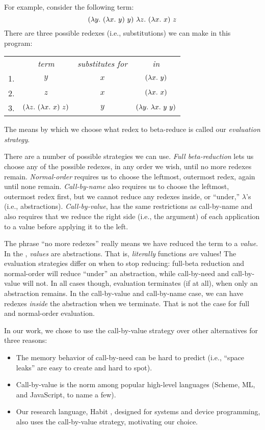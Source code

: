 \documentclass[12pt]{report}
\begin{document}
For example, consider the following term:
\begin{equation}
  \lamAppP{\lamAbs{y}{\lamAppP{\lamAbs{x}{y}}{y}}} %
         {\lamAbs{z}{\lamAppP{\lamAbs{x}{x}}{z}}}
\end{equation}
There are three possible redexes (i.e., substitutions) we can make in 
this program:

\begin{center}
  \begin{tabular}{lccc}
    & \emph{term} & \emph{substitutes for} & \emph{in} \\
    \cmidrule(r){2-2} \cmidrule(r){3-3} \cmidrule(r){4-4}
    1. & $y$ & $x$ & $(\lambda x.\ y)$ \\
    2. & $z$ & $x$ & $(\lambda x.\ x)$ \\
    3. & $(\lambda z.\ (\lambda x.\ x)\ z)$ & $y$ & $(\lambda y.\ \lambda x.\ y\ y)$
  \end{tabular}
\end{center}
The means by which we choose what redex to beta-reduce is called our
\emph{evaluation strategy}.

There are a number of possible strategies we can use. \emph{Full
  beta-reduction} lets us choose any of the possible redexes, in any
order we wish, until no more redexes remain. \emph{Normal-order}
requires us to choose the leftmost, outermost redex, again until none
remain. \emph{Call-by-name} also requires us to choose the leftmost,
outermost redex first, but we cannot reduce any redexes inside, or
``under,'' $\lambda$'s (i.e., abstractions). \emph{Call-by-value}, has
the same restrictions as call-by-name and also requires that we reduce
the right side (i.e., the argument) of each application to a value
before applying it to the left.

The phrase ``no more redexes'' really means we have reduced the term
to a \emph{value}. In the \lamA, \emph{values} are abstractions. That
is, \emph{literally} functions \emph{are} values! The evaluation
strategies differ on when to stop reducing: full-beta reduction and
normal-order will reduce ``under'' an abstraction, while call-by-need
and call-by-value will not. In all cases though, evaluation terminates
(if at all), when only an abstraction remains. In the call-by-value
and call-by-name case, we can have redexes \emph{inside} the
abstraction when we terminate. That is not the case for full and
normal-order evaluation.

In our work, we chose to use the call-by-value strategy over other
alternatives for three reasons:
\begin{itemize}
\item The memory behavior of call-by-need
  can be hard to predict (i.e., ``space leaks'' are easy to create and
  hard to spot). 
\item Call-by-value is the norm among popular high-level
  languages (Scheme, ML, and JavaScript, to name a few). 
\item Our research
  language, Habit \citep{HabitXX}, designed for systems and device
  programming, also uses the call-by-value strategy, motivating our
  choice.
\end{itemize}
\end{document}

